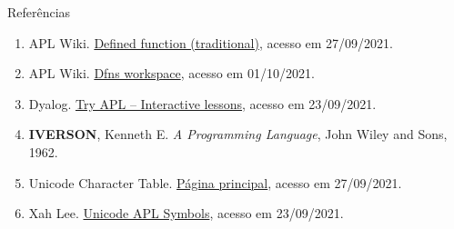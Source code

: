 \begin{frame}[fragile]{Referências}

    \begin{enumerate}
        \item APL Wiki. \href{https://aplwiki.com/wiki/Defined_function_traditional}{Defined function (traditional)}, acesso em 27/09/2021.

        \item APL Wiki. \href{https://aplwiki.com/wiki/Dfns_workspace}{Dfns workspace}, acesso em 01/10/2021.

        \item Dyalog. \href{https://tryapl.org/}{Try APL -- Interactive lessons}, acesso em 23/09/2021.
 
        \item \textbf{IVERSON}, Kenneth E. \textit{A Programming Language}, John Wiley and Sons, 1962.
        \item Unicode Character Table. \href{https://unicode-table.com/en}{Página principal}, acesso em 27/09/2021.

        \item Xah Lee. \href{http://xahlee.info/comp/unicode_APL_symbols.html}{Unicode APL Symbols}, acesso em 23/09/2021.
    \end{enumerate}

\end{frame}

